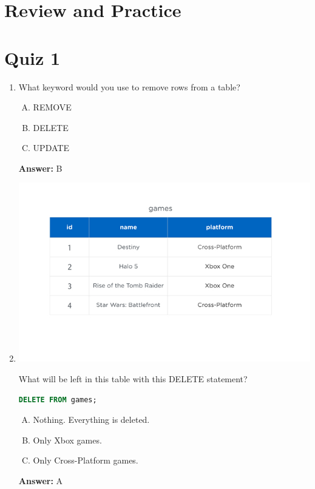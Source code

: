 \documentclass[12pt]{article}
\begin{document}
\bigskip

\section{Review and Practice}

\bigskip

\section{Quiz 1}

\bigskip

\begin{enumerate}[1.]
    \item

    What keyword would you use to remove rows from a table?

    \bigskip

    \begin{enumerate}[A.]
        \item REMOVE
        \item DELETE
        \item UPDATE
    \end{enumerate}

    \bigskip

    \textbf{Answer:} B

    \item

    \begin{center}
    \includegraphics[width=0.8 \linewidth]{images/part_3_notes_1.png}
    \end{center}

    \bigskip

    What will be left in this table with this DELETE statement?

    \bigskip

    \begin{lstlisting}[language=SQL]
    DELETE FROM games;
    \end{lstlisting}

    \bigskip

    \begin{enumerate}[A.]
        \item Nothing. Everything is deleted.
        \item Only Xbox games.
        \item Only Cross-Platform games.
    \end{enumerate}

    \bigskip

    \textbf{Answer:} A


\end{enumerate}
\end{document}
